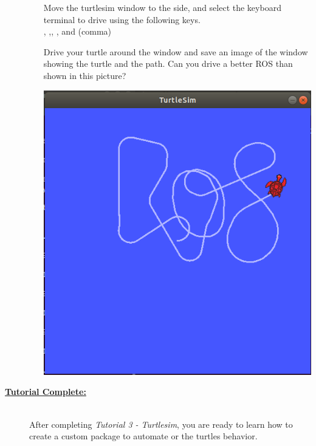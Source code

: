 \documentclass[12pt]{article}
\begin{document}
\begin{description}
\begin{enumerate}
\begin{multicols}{2}

\begin{framed}
Move the turtlesim window to the side, and select the keyboard terminal to drive using the following keys.\vspace{2mm}\\ \IKey, \JKey,\KayKey, \ELKey, and \COMMAKey (comma) \vspace{5mm}

Drive your turtle around the window and save an image of the window showing the turtle and the path. Can you drive a better ROS than shown in this picture? 
\end{framed}

\includegraphics[scale=0.35]{tutorial3_fig1.png}	
\end{multicols}			
			
\end{enumerate}  

\item[\textbf{\underline{Tutorial Complete:}}] \hfill \vspace{3mm}\\
After completing {\it Tutorial 3 - Turtlesim}, you are ready to learn how to create a custom package to automate or the turtles behavior.



\end{description}
\end{document}
